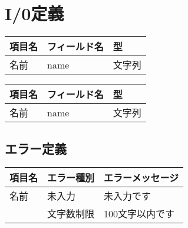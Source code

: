\documentclass[letterpaper,10pt,dvipdfmx]{sphinxmanual}
\begin{document}
\section{I/0定義}
\label{\detokenize{header:i-0}}


\begin{savenotes}\sphinxattablestart
\centering
\begin{tabulary}{\linewidth}[t]{|T|T|T|}
\hline
\sphinxstyletheadfamily 
項目名
&\sphinxstyletheadfamily 
フィールド名
&\sphinxstyletheadfamily 
型
\\
\hline
名前
&
name
&
文字列
\\
\hline
\end{tabulary}
\par
\sphinxattableend\end{savenotes}



\begin{savenotes}\sphinxattablestart
\centering
\begin{tabulary}{\linewidth}[t]{|T|T|T|}
\hline
\sphinxstyletheadfamily 
項目名
&\sphinxstyletheadfamily 
フィールド名
&\sphinxstyletheadfamily 
型
\\
\hline
名前
&
name
&
文字列
\\
\hline
\end{tabulary}
\par
\sphinxattableend\end{savenotes}


\subsection{エラー定義}
\label{\detokenize{header:id4}}

\begin{savenotes}\sphinxattablestart
\centering
\begin{tabulary}{\linewidth}[t]{|T|T|T|}
\hline
\sphinxstyletheadfamily 
項目名
&\sphinxstyletheadfamily 
エラー種別
&\sphinxstyletheadfamily 
エラーメッセージ
\\
\hline
名前
&
未入力
&
未入力です
\\
\hline&
文字数制限
&
100文字以内です
\\
\hline
\end{tabulary}
\par
\sphinxattableend\end{savenotes}
\end{document}
